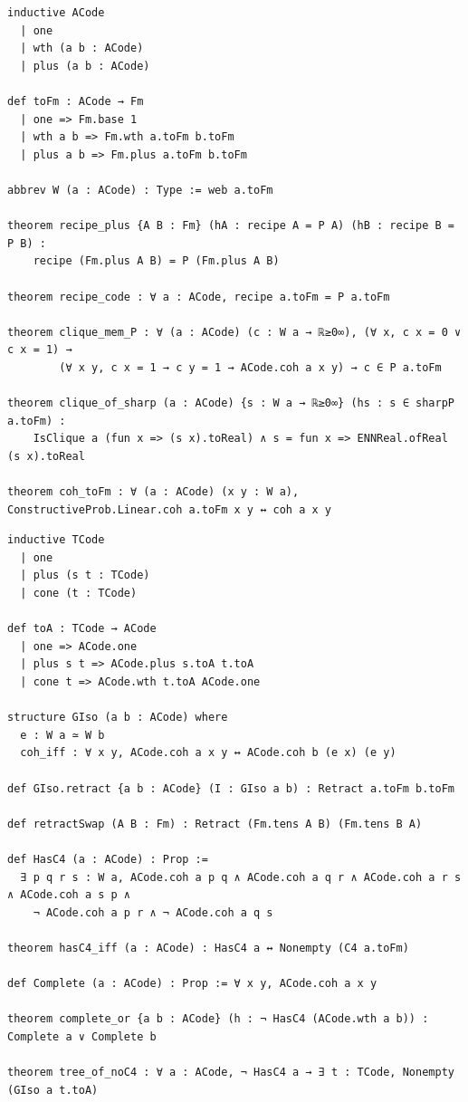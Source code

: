 \begin{lstlisting}
inductive ACode
  | one
  | wth (a b : ACode)
  | plus (a b : ACode)

def toFm : ACode → Fm
  | one => Fm.base 1
  | wth a b => Fm.wth a.toFm b.toFm
  | plus a b => Fm.plus a.toFm b.toFm

abbrev W (a : ACode) : Type := web a.toFm

theorem recipe_plus {A B : Fm} (hA : recipe A = P A) (hB : recipe B = P B) :
    recipe (Fm.plus A B) = P (Fm.plus A B)

theorem recipe_code : ∀ a : ACode, recipe a.toFm = P a.toFm

theorem clique_mem_P : ∀ (a : ACode) (c : W a → ℝ≥0∞), (∀ x, c x = 0 ∨ c x = 1) →
        (∀ x y, c x = 1 → c y = 1 → ACode.coh a x y) → c ∈ P a.toFm

theorem clique_of_sharp (a : ACode) {s : W a → ℝ≥0∞} (hs : s ∈ sharpP a.toFm) :
    IsClique a (fun x => (s x).toReal) ∧ s = fun x => ENNReal.ofReal (s x).toReal

theorem coh_toFm : ∀ (a : ACode) (x y : W a), ConstructiveProb.Linear.coh a.toFm x y ↔ coh a x y
\end{lstlisting}

\begin{lstlisting}
inductive TCode
  | one
  | plus (s t : TCode)
  | cone (t : TCode)

def toA : TCode → ACode
  | one => ACode.one
  | plus s t => ACode.plus s.toA t.toA
  | cone t => ACode.wth t.toA ACode.one

structure GIso (a b : ACode) where
  e : W a ≃ W b
  coh_iff : ∀ x y, ACode.coh a x y ↔ ACode.coh b (e x) (e y)

def GIso.retract {a b : ACode} (I : GIso a b) : Retract a.toFm b.toFm

def retractSwap (A B : Fm) : Retract (Fm.tens A B) (Fm.tens B A)

def HasC4 (a : ACode) : Prop :=
  ∃ p q r s : W a, ACode.coh a p q ∧ ACode.coh a q r ∧ ACode.coh a r s ∧ ACode.coh a s p ∧
    ¬ ACode.coh a p r ∧ ¬ ACode.coh a q s

theorem hasC4_iff (a : ACode) : HasC4 a ↔ Nonempty (C4 a.toFm)

def Complete (a : ACode) : Prop := ∀ x y, ACode.coh a x y

theorem complete_or {a b : ACode} (h : ¬ HasC4 (ACode.wth a b)) : Complete a ∨ Complete b

theorem tree_of_noC4 : ∀ a : ACode, ¬ HasC4 a → ∃ t : TCode, Nonempty (GIso a t.toA)
\end{lstlisting}

